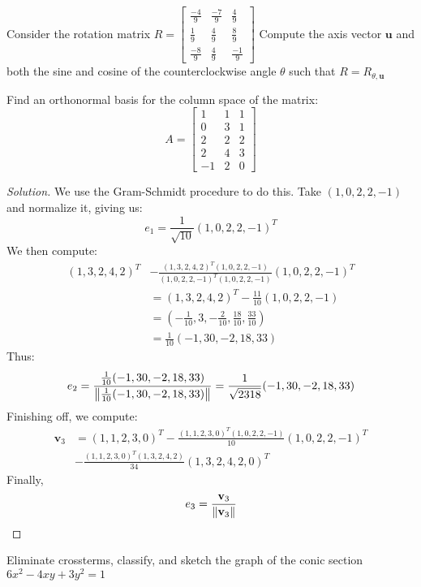 \documentclass[../main.tex]{subfiles}
\begin{document}
%
\begin{problem}
Consider the rotation matrix $R = \begin{bmatrix} \frac{-4}{9} & \frac{-7}{9} & \frac{4}{9} \\ \frac{1}{9} & \frac{4}{9} & \frac{8}{9} \\ \frac{-8}{9} & \frac{4}{9} & \frac{-1}{9} \end{bmatrix}$ Compute the axis vector $\textbf{u}$ and both the sine and cosine of the counterclockwise angle $\theta$ such that $R = R_{\theta,\textbf{u}}$
\end{problem}
%
\begin{problem}
Find an orthonormal basis for the column space of the matrix:
%
\begin{equation*}
    A = \begin{bmatrix} 1 & 1 & 1 \\ 0 & 3 & 1 \\ 2 & 2 & 2 \\ 2 & 4 & 3 \\ -1 & 2 & 0 \end{bmatrix}
\end{equation*}
\end{problem}
\begin{proof}[Solution]
We use the Gram-Schmidt procedure to do this. Take $(1,0,2,2,-1)$ and normalize it, giving us:
%
\begin{equation*}
    e_{1} = \frac{1}{\sqrt{10}}(1,0,2,2,-1)^T    
\end{equation*}
%
We then compute:
%
\begin{align*}
    (1,3,2,4,2)^T &- \frac{(1,3,2,4,2)^T(1,0,2,2,-1)}{(1,0,2,2,-1)^T (1,0,2,2,-1)}(1,0,2,2,-1)^T\\
    &= (1,3,2,4,2)^T-\frac{11}{10}(1,0,2,2,-1)\\
    &=(-\frac{1}{10},3,-\frac{2}{10},\frac{18}{10},\frac{33}{10})\\
    &= \frac{1}{10}(-1,30,-2,18,33)
\end{align*}
%
Thus:
%
\begin{equation*}
    e_{2} = \frac{ \frac{1}{10}(-1,30,-2,18,33)}{\norm{ \frac{1}{10}(-1,30,-2,18,33)}} = \frac{1}{\sqrt{2318}}(-1,30,-2,18,33)
\end{equation*}
%
Finishing off, we compute:
%
\begin{align*}
    \mathbf{v}_{3} &= (1,1,2,3,0)^T - \frac{(1,1,2,3,0)^T(1,0,2,2,-1)}{10}(1,0,2,2,-1)^T\\
    &- \frac{(1,1,2,3,0)^T(1,3,2,4,2)}{34}(1,3,2,4,2,0)^T     
\end{align*}
Finally,
%
\begin{equation*}
    e_3 = \frac{\textbf{v}_3}{\norm{\textbf{v}_3}}
\end{equation*}
\end{proof}
%
\begin{problem}
Eliminate crossterms, classify, and sketch the graph of the conic section $6x^2 - 4xy+3y^2 = 1$
\end{problem}
%
\end{document}
